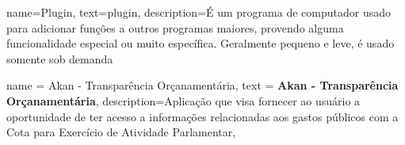
{
  name=Plugin,
  text=plugin,
  description={É um programa de computador usado para adicionar funções a outros programas maiores, provendo alguma funcionalidade especial ou muito específica. Geralmente pequeno e leve, é usado somente sob demanda}
}


{
	name = Akan - Transpar\^encia Or\c canament\'aria,
	text = \textbf{Akan - Transpar\^encia Or\c canament\'aria},
	description={Aplicação que visa fornecer ao usuário a oportunidade de ter acesso a informações relacionadas aos gastos públicos com a Cota para Exercício de Atividade Parlamentar},
}
